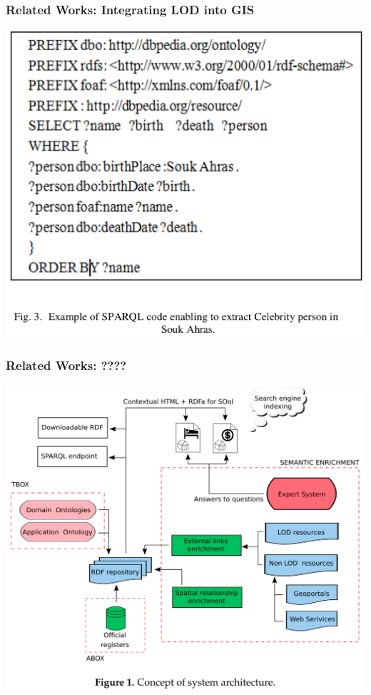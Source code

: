 \documentclass[10pt]{beamer}
\begin{document}
\begin{frame}
  \frametitle{Related Works: Integrating LOD into GIS}
  \centering
  \includegraphics[width=\linewidth]{integrating-lod-gis-query.png}
\end{frame}

\begin{frame}
  \frametitle{Related Works: ????}
  \centering
  \includegraphics[width=0.8\linewidth]{integrating-tech.png}
\end{frame}
\end{document}
